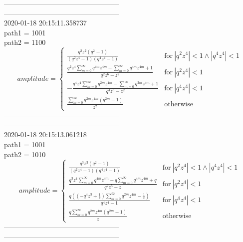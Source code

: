 \documentclass{jsreport}
\begin{document}
--------------------------------------------------\\
--------------------------------------------------\\
2020-01-18 20:15:11.358737\\
path1 = 1001\\
path2 = 1100\\
$$amplitude = \begin{cases} \frac{q^{2} z^{2} \left(q^{2} - 1\right)}{\left(q^{2} z^{4} - 1\right) \left(q^{4} z^{4} - 1\right)} & \text{for}\: \left|{q^{2} z^{4}}\right| < 1 \wedge \left|{q^{4} z^{4}}\right| < 1 \\\frac{q^{2} z^{4} \sum_{m=0}^{\infty} q^{4 m} z^{4 m} - \sum_{m=0}^{\infty} q^{4 m} z^{4 m} + 1}{q^{2} z^{6} - z^{2}} & \text{for}\: \left|{q^{2} z^{4}}\right| < 1 \\- \frac{q^{4} z^{4} \sum_{m=0}^{\infty} q^{2 m} z^{4 m} - \sum_{m=0}^{\infty} q^{2 m} z^{4 m} + 1}{q^{4} z^{6} - z^{2}} & \text{for}\: \left|{q^{4} z^{4}}\right| < 1 \\\frac{\sum_{m=0}^{\infty} q^{2 m} z^{4 m} \left(q^{2 m} - 1\right)}{z^{2}} & \text{otherwise} \end{cases}$$
--------------------------------------------------\\
--------------------------------------------------\\
2020-01-18 20:15:13.061218\\
path1 = 1001\\
path2 = 1010\\
$$amplitude = \begin{cases} \frac{q^{3} z^{3} \left(q^{2} - 1\right)}{\left(q^{2} z^{4} - 1\right) \left(q^{4} z^{4} - 1\right)} & \text{for}\: \left|{q^{2} z^{4}}\right| < 1 \wedge \left|{q^{4} z^{4}}\right| < 1 \\\frac{q^{3} z^{4} \sum_{m=0}^{\infty} q^{4 m} z^{4 m} - q \sum_{m=0}^{\infty} q^{4 m} z^{4 m} + q}{q^{2} z^{5} - z} & \text{for}\: \left|{q^{2} z^{4}}\right| < 1 \\\frac{q \left(\left(- q^{4} z^{3} + \frac{1}{z}\right) \sum_{m=0}^{\infty} q^{2 m} z^{4 m} - \frac{1}{z}\right)}{q^{4} z^{4} - 1} & \text{for}\: \left|{q^{4} z^{4}}\right| < 1 \\\frac{q \sum_{m=0}^{\infty} q^{2 m} z^{4 m} \left(q^{2 m} - 1\right)}{z} & \text{otherwise} \end{cases}$$
--------------------------------------------------\\
--------------------------------------------------\\
\end{document}
